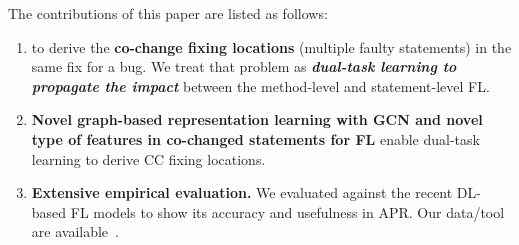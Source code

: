 


The contributions of this paper are listed as follows:

\begin{enumerate}

\item {}
  to derive the {\bf co-change fixing locations} (multiple faulty statements)
  in the same fix for a bug. We treat that problem as {\bf {\em
      dual-task learning to propagate the impact}} between the
  method-level and statement-level FL.


\item {\bf Novel graph-based representation learning with GCN and
  novel type of features in co-changed statements for FL}
  enable dual-task learning to derive CC fixing locations.

\item {\bf Extensive empirical evaluation.} We evaluated {\tool}
  against the recent DL-based FL models to show its accuracy and
  usefulness in APR. Our data/tool are
  available~\cite{FixLocator2022}.

\end{enumerate}
